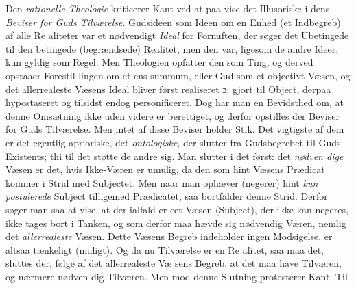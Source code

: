 \documentclass[12pt,a4paper]{book}
\begin{document}
Den \emph{rationelle Theologie} kriticerer Kant ved at paa\-%
vise det Illusoriske i dens \emph{Beviser for Guds Tilværelse}.
Gudsideen som Ideen om en Enhed (et Indbegreb) af alle Re\-%
aliteter var et nødvendigt \emph{Ideal} for Fornuften, der søger det
Ubetingede til den betingede (begrændsede) Realitet, men den
var, ligesom de andre Ideer, kun gyldig som Regel. Men
Theologien opfatter den som Ting, og derved opstaaer Forestil\-%
lingen om et ens summum, eller Gud som et objectivt Væsen,
og det allerrealeste Væsens Ideal bliver først realiseret ɔ: gjort
til Object, derpaa hypostaseret og tilsidst endog personificeret.
Dog har man en Bevidsthed om, at denne Omsætning ikke
uden videre er berettiget, og derfor opstilles der Beviser for
Guds Tilværelse. Men intet af disse Beviser holder Stik. Det
vigtigste af dem er det egentlig aprioriske, det \emph{ontologiske},
der slutter fra Gudsbegrebet til Guds Existents; thi til det
støtte de andre sig. Man slutter i det først: det \emph{nødven\-%
dige} Væsen er det, hvis Ikke-Væren er umulig, da den som
hint Væsens Prædicat kommer i Strid med Subjectet. Men
naar man ophæver (negerer) hint \emph{kun postulerede} Subject
tilligemed Prædicatet, saa bortfalder denne Strid. Derfor søger
man saa at vise, at der ialfald er eet Væsen (Subject), der
ikke kan negeres, ikke tages bort i Tanken, og som derfor
maa hævde sig nødvendig Væren, nemlig det \emph{allerrealeste}
Væsen. Dette Væsens Begreb indeholder ingen Modsigelse,
er altsaa tænkeligt (muligt). Og da nu Tilværelse er en Re\-%
alitet, saa maa det, sluttes der, følge af det allerrealeste Væ\-%
sens Begreb, at det maa have Tilværen, og nærmere nødven\-%
dig Tilværen. Men mod denne Slutning protesterer Kant. Til\-%
\end{document}
